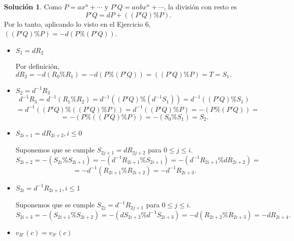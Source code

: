 \documentclass[10pt]{article}
\theoremstyle{definition}
\newtheorem*{sol}{Solución}
\begin{document}
\begin{sol} Como $P=ax^n+\cdots$ y $P'Q=anbx^n+\cdots$, la división con resto es \[P'Q = dP + ((P'Q)\% P).\]
Por lo tanto, aplicando lo visto en el Ejercicio 6, $((P'Q)\% P)=-d(P\% (P'Q))$.
\begin{itemize}
    \item $S_1=dR_2$
    
    Por definición, $dR_2=-d(R_0\%R_1)=-d(P\% (P'Q))=((P'Q)\% P)=T=S_1.$
    \item $S_2=d^{-1}R_3$
    \[d^{-1}R_3=d^{-1}(R_1\%R_2)=d^{-1}((P'Q)\%(d^{-1}S_1))=d^{-1}((P'Q)\% S_1)\]
    \[=d^{-1}((P'Q)\% ((P'Q)\%P))=d^{-1}((P'Q)\% P)=-(P\%(P'Q))=\]\[=-(P\%((P'Q)\% P))=-(S_0\%S_1)=S_2.\]
    \item $S_{2i+1}=dR_{2i+2},i\leq 0$
    
    Suponemos que se cumple $S_{2j+1}=dR_{2j+2}$ para $0\leq j\leq i$.
    \[S_{2i+2}=-(S_{2i}\%S_{2i+1})=-(d^{-1}R_{2i+1}\%S_{2i+1})=-(d^{-1}R_{2i+1}\%dR_{2i+2})=\]\[=-d^{-1}(R_{2i+1}\% R_{2i+2})=-d^{-1}R_{2i+3}.\]
    \item $S_{2i}=d^{-1}R_{2i+1},i\leq 1$
    
    Suponemos que se cumple $S_{2j}=d^{-1}R_{2j+1}$ para $0\leq j\leq i$. \[S_{2i+3}=-(S_{2i+1}\%S_{2i+2})=-(dS_{2i+2}\%d^{-1}S_{2i+3})=-d(R_{2i+2}\%R_{2i+3})=-dR_{2i+4}.\]
    \item $v_{R'}(c)=v_{S'}(c)$
    

\end{itemize}
\end{sol}
\end{document}
